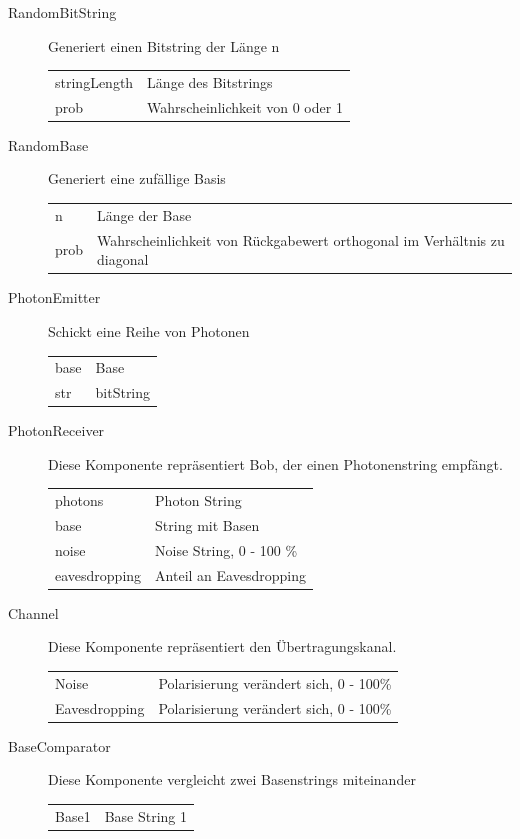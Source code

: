 \documentclass[a4paper,10.2pt,pdftex]{scrartcl}%
\begin{document}
\begin{description} 
\item[RandomBitString] Generiert einen Bitstring der Länge n \\
\begin{tabular}{p{3cm}p{9cm}}
stringLength & Länge des Bitstrings \\
prob & Wahrscheinlichkeit von 0 oder 1 \\
\end{tabular}
\item[RandomBase]  Generiert eine zufällige Basis \\
\begin{tabular}{p{3cm}p{7.5cm}}
n & Länge der Base \\    
prob & Wahrscheinlichkeit von Rückgabewert orthogonal im Verhältnis zu diagonal
\end{tabular} 
\item[PhotonEmitter] Schickt eine Reihe von Photonen  \\
\begin{tabular}{p{3cm}p{9cm}}
base & Base \\
str & bitString \\  
\end{tabular}
\item[PhotonReceiver]
Diese Komponente repräsentiert Bob, der einen Photonenstring empfängt.  \\
\begin{tabular}{p{3cm}p{7.5cm}}
photons & Photon String   \\
base  & String mit Basen  \\
noise &  Noise String, 0 - 100  \% \\ 
eavesdropping  & Anteil an Eavesdropping 
\end{tabular} 
\item[Channel] 
Diese Komponente repräsentiert den Übertragungskanal. \\
\begin{tabular}{p{3cm}p{7.5cm}}
Noise  & Polarisierung verändert sich, 0 - 100\% \\
Eavesdropping & Polarisierung verändert sich, 0 - 100\% \\
\end{tabular} 
\item[BaseComparator] Diese Komponente vergleicht zwei Basenstrings miteinander \\  \begin{tabular}{p{3cm}p{9cm}}
Base1 & Base String 1   \\

\end{tabular}
\end{description}
\end{document}
